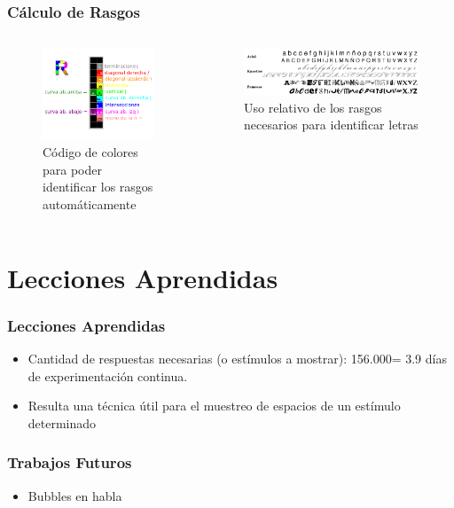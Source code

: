 \documentclass{beamer}
\begin{document}
	\begin{frame}
	\frametitle{Cálculo de Rasgos}
	\begin{columns} [t]
	\begin{figure}
	\includegraphics[width=.8\textwidth]{graficos/REFERENCIA.png}
	\caption{Código de colores para poder identificar los rasgos automáticamente}
	\end{figure}
	\begin{figure}
	\includegraphics[width=.5\textwidth]{graficos/letras.png}
	\caption{Uso relativo de los rasgos necesarios para identificar letras}
	\end{figure}
	\end{columns}
	\end{frame}



\section{Lecciones Aprendidas}
	\begin{frame}
	\frametitle{Lecciones Aprendidas}
	\begin{itemize}
	\item Cantidad de respuestas necesarias (o estímulos a mostrar): 156.000= 3.9 días de experimentación continua.
	\item Resulta una técnica útil para el muestreo de espacios de un estímulo determinado
	\end{itemize}
	\end{frame}

	\begin{frame}
	\frametitle{Trabajos Futuros}
	\begin{itemize}
	\item Bubbles en habla
	\end{itemize}
	\end{frame}


\author[Cossio Mercado,G\'omez Mayol,Mart\'inez Soler]{Mail\'en G\'omez Mayol,\\Miguel Mart\'inez Soler,\\Christian Cossio Mercado}
\begin{frame}
 \titlepage
\end{frame}
\end{document}
